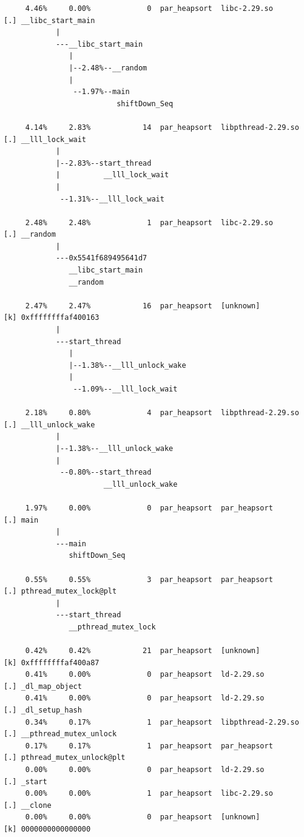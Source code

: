 \documentclass{article}
\begin{document}
\begin{verbatim}
     4.46%     0.00%             0  par_heapsort  libc-2.29.so        [.] __libc_start_main
            |
            ---__libc_start_main
               |
               |--2.48%--__random
               |
                --1.97%--main
                          shiftDown_Seq

     4.14%     2.83%            14  par_heapsort  libpthread-2.29.so  [.] __lll_lock_wait
            |
            |--2.83%--start_thread
            |          __lll_lock_wait
            |
             --1.31%--__lll_lock_wait

     2.48%     2.48%             1  par_heapsort  libc-2.29.so        [.] __random
            |
            ---0x5541f689495641d7
               __libc_start_main
               __random

     2.47%     2.47%            16  par_heapsort  [unknown]           [k] 0xffffffffaf400163
            |
            ---start_thread
               |
               |--1.38%--__lll_unlock_wake
               |
                --1.09%--__lll_lock_wait

     2.18%     0.80%             4  par_heapsort  libpthread-2.29.so  [.] __lll_unlock_wake
            |
            |--1.38%--__lll_unlock_wake
            |
             --0.80%--start_thread
                       __lll_unlock_wake

     1.97%     0.00%             0  par_heapsort  par_heapsort        [.] main
            |
            ---main
               shiftDown_Seq

     0.55%     0.55%             3  par_heapsort  par_heapsort        [.] pthread_mutex_lock@plt
            |
            ---start_thread
               __pthread_mutex_lock

     0.42%     0.42%            21  par_heapsort  [unknown]           [k] 0xffffffffaf400a87
     0.41%     0.00%             0  par_heapsort  ld-2.29.so          [.] _dl_map_object
     0.41%     0.00%             0  par_heapsort  ld-2.29.so          [.] _dl_setup_hash
     0.34%     0.17%             1  par_heapsort  libpthread-2.29.so  [.] __pthread_mutex_unlock
     0.17%     0.17%             1  par_heapsort  par_heapsort        [.] pthread_mutex_unlock@plt
     0.00%     0.00%             0  par_heapsort  ld-2.29.so          [.] _start
     0.00%     0.00%             1  par_heapsort  libc-2.29.so        [.] __clone
     0.00%     0.00%             0  par_heapsort  [unknown]           [k] 0000000000000000
\end{verbatim}
\normalsize
\end{document}
